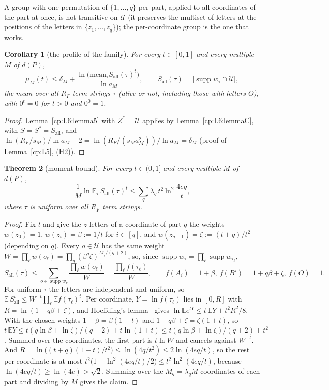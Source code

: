 \documentclass[11pt]{article}
\newtheorem{theorem}{Theorem}[section]
\newtheorem{corollary}[theorem]{Corollary}
\theoremstyle{definition}
\theoremstyle{remark}
\newcommand{\abs}[1]{\lvert #1\rvert}
\DeclareMathOperator{\supp}{supp}
\newcommand{\Hcond}[1]{\textup{(H#1)}}        %
\newcommand{\Sall}{S_{\mathrm{all}}}          %
\newcommand{\Ukept}{\mathcal{U}}              %
\newcommand{\Bp}{B'}                          %
\newcommand{\Oterm}{O}                        %
\begin{document}
A group with one permutation of $\{1,\dots,q\}$ per part, applied to all coordinates of the part at once, is not transitive on $\Ukept$ (it preserves the multiset of letters at the positions of the letters in $\{z_1,\dots,z_q\}$); the per-coordinate group is the one that works.

\begin{corollary}[the profile of the family]\label{cp:L6}
For every $t\in[0,1]$ and every multiple $M$ of $d(P)$,
\[
\mu_M(t)\le\delta_M+\frac{\ln\bigl(\mathrm{mean}_\tau\Sall(\tau)^t\bigr)}{\ln a_M},\qquad\Sall(\tau)=\abs{\supp w_\tau\cap\Ukept},
\]
the mean over all $R_F$ term strings $\tau$ (alive or not, including those with letters $\Oterm$), with $0^t=0$ for $t>0$ and $0^0=1$.
\end{corollary}

\begin{proof}
Lemma~\ref{cp:L6:lemma5} with $Z^*=\Ukept$ applies by Lemma~\ref{cp:L6:lemmaC}, with $\bar S=S^*=\Sall$, and $\ln(R_F/s_M)/\ln a_M-2=\ln(R_F/(s_Ma_M^2))/\ln a_M=\delta_M$ (proof of Lemma~\ref{cp:L5}, \Hcond2).
\end{proof}

\begin{theorem}[moment bound]\label{cp:L7}
For every $t\in(0,1]$ and every multiple $M$ of $d(P)$,
\[
\frac1M\ln\mathbb E_\tau\,\Sall(\tau)^t\le\sum_q\lambda_q\,t^2\ln^2\frac{4eq}t,
\]
where $\tau$ is uniform over all $R_F$ term strings.
\end{theorem}

\begin{proof}
Fix $t$ and give the $z$-letters of a coordinate of part $q$ the weights $w(z_0)=1$, $w(z_i)=\beta:=1/t$ for $i\in[q]$, and $w(z_{q+1})=\zeta:=(t+q)/t^2$ (depending on $q$). Every $o\in\Ukept$ has the same weight $W=\prod_\ell w(o_\ell)=\prod_q(\beta^q\zeta)^{M_q/(q+2)}$, so, since $\supp w_\tau=\prod_\ell\supp w_{\tau_\ell}$,
\[
\Sall(\tau)\le\sum_{o\in\supp w_\tau}\frac{\prod_\ell w(o_\ell)}W=\frac{\prod_\ell f(\tau_\ell)}W,\qquad f(A_i)=1+\beta,\ f(\Bp)=1+q\beta+\zeta,\ f(\Oterm)=1.
\]
For uniform $\tau$ the letters are independent and uniform, so $\mathbb E\,\Sall^t\le W^{-t}\prod_\ell\mathbb Ef(\tau_\ell)^t$. Per coordinate, $Y=\ln f(\tau_\ell)$ lies in $[0,R]$ with $R=\ln(1+q\beta+\zeta)$, and Hoeffding's lemma~\cite{Hoe63} gives $\ln\mathbb Ee^{tY}\le t\,\mathbb EY+t^2R^2/8$. With the chosen weights $1+\beta=\beta(1+t)$ and $1+q\beta+\zeta=\zeta(1+t)$, so $t\,\mathbb EY\le t(q\ln\beta+\ln\zeta)/(q+2)+t\ln(1+t)\le t(q\ln\beta+\ln\zeta)/(q+2)+t^2$. Summed over the coordinates, the first part is $t\ln W$ and cancels against $W^{-t}$. And $R=\ln\bigl((t+q)(1+t)/t^2\bigr)\le\ln(4q/t^2)\le2\ln(4eq/t)$, so the rest per coordinate is at most $t^2\bigl(1+\ln^2(4eq/t)/2\bigr)\le t^2\ln^2(4eq/t)$, because $\ln(4eq/t)\ge\ln(4e)>\sqrt2$. Summing over the $M_q=\lambda_qM$ coordinates of each part and dividing by $M$ gives the claim.
\end{proof}
\end{document}
